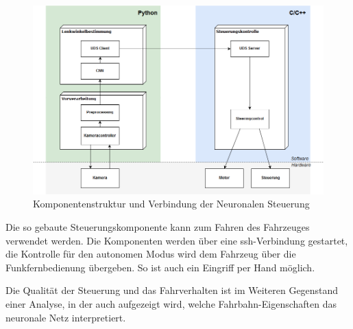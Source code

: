 \begin{figure}[h]
	\centering
	\includegraphics[width=1\linewidth]{figures/Steuerung.png}
	\caption{Komponentenstruktur und Verbindung der Neuronalen Steuerung}
	\label{fig:steuerung}
\end{figure}

Die so gebaute Steuerungskomponente kann zum Fahren des Fahrzeuges verwendet werden. Die Komponenten werden über eine ssh-Verbindung gestartet, die Kontrolle für den autonomen Modus wird dem Fahrzeug über die Funkfernbedienung übergeben. So ist auch ein Eingriff per Hand möglich.

Die Qualität der Steuerung und das Fahrverhalten ist im Weiteren Gegenstand einer Analyse, in der auch aufgezeigt wird, welche Fahrbahn-Eigenschaften das neuronale Netz interpretiert.



